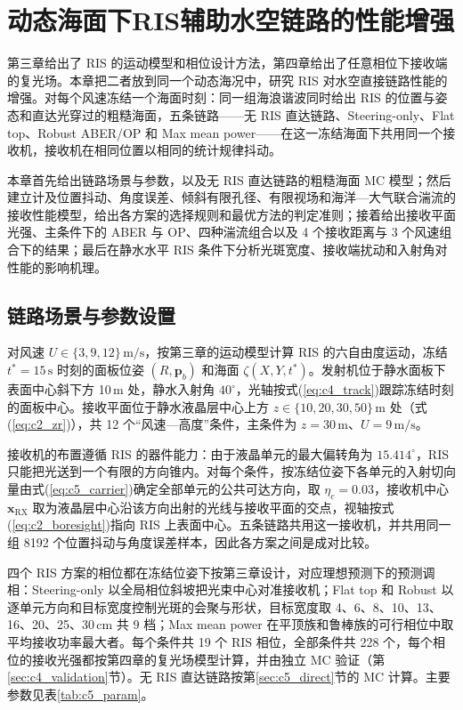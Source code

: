 \chapter{动态海面下RIS辅助水空链路的性能增强}
\label{chap:phase}

第三章给出了 RIS 的运动模型和相位设计方法，第四章给出了任意相位下接收端的复光场。本章把二者放到同一个动态海况中，研究 RIS 对水空直接链路性能的增强。对每个风速冻结一个海面时刻：同一组海浪谐波同时给出 RIS 的位置与姿态和直达光穿过的粗糙海面，五条链路——无 RIS 直达链路、Steering-only、Flat top、Robust ABER/OP 和 Max mean power——在这一冻结海面下共用同一个接收机，接收机在相同位置以相同的统计规律抖动。

本章首先给出链路场景与参数，以及无 RIS 直达链路的粗糙海面 MC 模型；然后建立计及位置抖动、角度误差、倾斜有限孔径、有限视场和海洋—大气联合湍流的接收性能模型，给出各方案的选择规则和最优方法的判定准则；接着给出接收平面光强、主条件下的 ABER 与 OP、四种湍流组合以及 4 个接收距离与 3 个风速组合下的结果；最后在静水水平 RIS 条件下分析光斑宽度、接收端扰动和入射角对性能的影响机理。

\section{链路场景与参数设置}
\label{sec:c5_scene}

对风速 $U\in\{3,9,12\}\,\mathrm{m/s}$，按第三章的运动模型计算 RIS 的六自由度运动，冻结 $t^\ast=15\,\mathrm s$ 时刻的面板位姿 $(R,\mathbf p_b)$ 和海面 $\zeta(X,Y,t^\ast)$。发射机位于静水面板下表面中心斜下方 10\,m 处，静水入射角 $40^\circ$，光轴按式(\ref{eq:c4_track})跟踪冻结时刻的面板中心。接收平面位于静水液晶层中心上方 $z\in\{10,20,30,50\}\,\mathrm m$ 处（式(\ref{eq:c2_zr})），共 12 个“风速—高度”条件，主条件为 $z=30\,\mathrm m$、$U=9\,\mathrm{m/s}$。

接收机的布置遵循 RIS 的器件能力：由于液晶单元的最大偏转角为 $15.414^\circ$，RIS 只能把光送到一个有限的方向锥内。对每个条件，按冻结位姿下各单元的入射切向量由式(\ref{eq:c5_carrier})确定全部单元的公共可达方向，取 $\eta_c=0.03$，接收机中心 $\mathbf x_{\mathrm{RX}}$ 取为液晶层中心沿该方向出射的光线与接收平面的交点，视轴按式(\ref{eq:c2_boresight})指向 RIS 上表面中心。五条链路共用这一接收机，并共用同一组 8192 个位置抖动与角度误差样本，因此各方案之间是成对比较。

四个 RIS 方案的相位都在冻结位姿下按第三章设计，对应理想预测下的预测调相：Steering-only 以全局相位斜坡把光束中心对准接收机；Flat top 和 Robust 以逐单元方向和目标宽度控制光斑的会聚与形状，目标宽度取 4、6、8、10、13、16、20、25、30\,cm 共 9 档；Max mean power 在平顶族和鲁棒族的可行相位中取平均接收功率最大者。每个条件共 19 个 RIS 相位，全部条件共 228 个，每个相位的接收光强都按第四章的复光场模型计算，并由独立 MC 验证（第\ref{sec:c4_validation}节）。无 RIS 直达链路按第\ref{sec:c5_direct}节的 MC 计算。主要参数见表\ref{tab:c5_param}。

